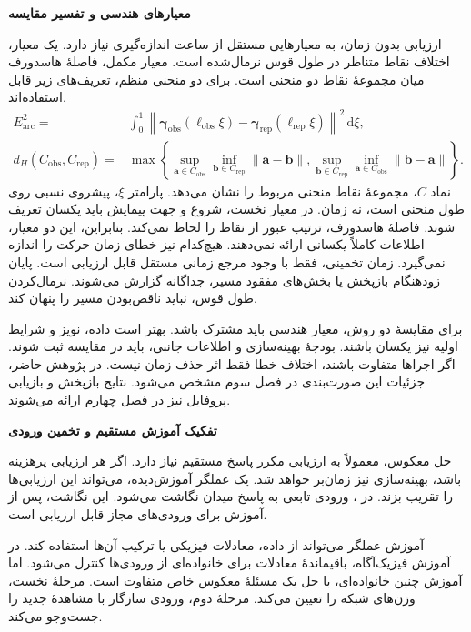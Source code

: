 \textbf{معیارهای هندسی و تفسیر مقایسه}

ارزیابی بدون زمان، به معیارهایی مستقل از ساعت اندازه‌گیری نیاز دارد.
یک معیار، اختلاف نقاط متناظر در طول قوس نرمال‌شده است.
معیار مکمل، فاصلهٔ هاسدورف میان مجموعهٔ نقاط دو منحنی است.
برای دو منحنی منظم، تعریف‌های زیر قابل استفاده‌اند.
\begin{equation}
\begin{aligned}
E_{\mathrm{arc}}^2={}&
\int_0^1\left\|
\boldsymbol\gamma_{\mathrm{obs}}(\ell_{\mathrm{obs}}\xi)
-\boldsymbol\gamma_{\mathrm{rep}}(\ell_{\mathrm{rep}}\xi)
\right\|^2\,\mathrm d\xi,\\
d_H(C_{\mathrm{obs}},C_{\mathrm{rep}})={}&
\max\left\{
\sup_{\mathbf a\in C_{\mathrm{obs}}}\inf_{\mathbf b\in C_{\mathrm{rep}}}
\|\mathbf a-\mathbf b\|,
\sup_{\mathbf b\in C_{\mathrm{rep}}}\inf_{\mathbf a\in C_{\mathrm{obs}}}
\|\mathbf b-\mathbf a\|
\right\}.
\end{aligned}
\label{eq:lit-untimed-geometric-errors}
\end{equation}
نماد $C$، مجموعهٔ نقاط منحنی مربوط را نشان می‌دهد.
پارامتر $\xi$، پیشروی نسبی روی طول منحنی است، نه زمان.
در معیار نخست، شروع و جهت پیمایش باید یکسان تعریف شوند.
فاصلهٔ هاسدورف، ترتیب عبور از نقاط را لحاظ نمی‌کند.
بنابراین، این دو معیار، اطلاعات کاملاً یکسانی ارائه نمی‌دهند.
هیچ‌کدام نیز خطای زمان حرکت را اندازه نمی‌گیرد.
زمان تخمینی، فقط با وجود مرجع زمانی مستقل قابل ارزیابی است.
پایان زودهنگام بازپخش یا بخش‌های مفقود مسیر، جداگانه گزارش می‌شوند.
نرمال‌کردن طول قوس، نباید ناقص‌بودن مسیر را پنهان کند.

برای مقایسهٔ دو روش، معیار هندسی باید مشترک باشد.
بهتر است داده، نویز و شرایط اولیه نیز یکسان باشند.
بودجهٔ بهینه‌سازی و اطلاعات جانبی، باید در مقایسه ثبت شوند.
اگر اجراها متفاوت باشند، اختلاف خطا فقط اثر حذف زمان نیست.
در پژوهش حاضر، جزئیات این صورت‌بندی در فصل سوم مشخص می‌شود.
نتایج بازپخش و بازیابی پروفایل نیز در فصل چهارم ارائه می‌شوند.

\label{sec:lit-frozen-operator-inverse}

\textbf{تفکیک آموزش مستقیم و تخمین ورودی}

حل معکوس، معمولاً به ارزیابی مکرر پاسخ مستقیم نیاز دارد.
اگر هر ارزیابی پرهزینه باشد، بهینه‌سازی نیز زمان‌بر خواهد شد.
یک عملگر آموزش‌دیده، می‌تواند این ارزیابی‌ها را تقریب بزند.
در ، ورودی تابعی به پاسخ میدان نگاشت می‌شود.
این نگاشت، پس از آموزش برای ورودی‌های مجاز قابل ارزیابی است.
\cite{lu2021deeponet}

آموزش عملگر می‌تواند از داده، معادلات فیزیکی یا ترکیب آن‌ها استفاده کند.
در آموزش فیزیک‌آگاه، باقیماندهٔ معادلات برای خانواده‌ای از ورودی‌ها کنترل می‌شود.
اما آموزش چنین خانواده‌ای، با حل یک مسئلهٔ معکوس خاص متفاوت است.
مرحلهٔ نخست، وزن‌های شبکه را تعیین می‌کند.
مرحلهٔ دوم، ورودی سازگار با مشاهدهٔ جدید را جست‌وجو می‌کند.
\cite{wang2021pideeponet}

